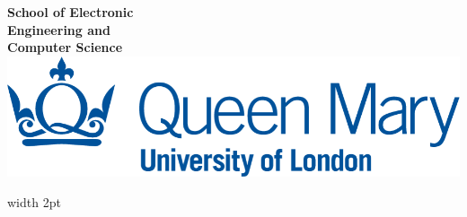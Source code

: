 \documentclass[a4paper,12pt,times]{report}
\begin{document}
	

\doublespacing{}

\begin{minipage}[t]{0.40\textwidth}
	{\large \textbf{School of Electronic\\Engineering and\\Computer Science}}\vspace{16.5cm}\newline
	\includegraphics[scale=0.15]{Logo.png}\vspace{0.5cm}
\end{minipage}
\vline width 2pt
\hspace{0.8cm}
\end{document}
